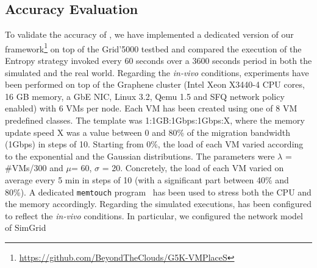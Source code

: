 \subsection{Accuracy Evaluation}
\label{subsec:accuracy}

To validate the accuracy of \vmps, we have implemented a dedicated
version of our
framework\footnote{\url{https://github.com/BeyondTheClouds/G5K-VMPlaceS}}
on top of the Grid'5000 testbed and compared the execution of the
Entropy strategy invoked every 60 seconds over a 3600 seconds period
in both the simulated and the real world.  Regarding the
\textit{in-vivo} conditions, experiments have been performed on top of
the Graphene cluster (Intel Xeon X3440-4 CPU cores, 16 GB memory, a
GbE NIC, Linux 3.2, Qemu 1.5 and SFQ network policy enabled) with 6
VMs per node.  Each VM has been created using one of 8 VM predefined
classes.
The template was 1:1GB:1Gbps:1Gbps:X, where the memory update
speed X was a value between 0 and 80\% of the migration bandwidth
(1Gbps) in steps of 10. Starting from 0\%, the load of each VM varied
according to the exponential and the Gaussian distributions. The
parameters were $\lambda$ = \#VMs/300 and $\mu$= 60, $\sigma$ = 20.
Concretely, the load of each VM varied on average every 5 min in steps
of 10 (with a significant part between 40\% and 80\%). A dedicated
\texttt{memtouch} program~\cite{Hirofuchi:2013:ALM:2568486.2568524}
has been used to stress both the CPU and the memory
accordingly.
Regarding the simulated executions, \vmps has been
configured to reflect the \textit{in-vivo} conditions.
In particular,
we configured the network model of SimGrid
